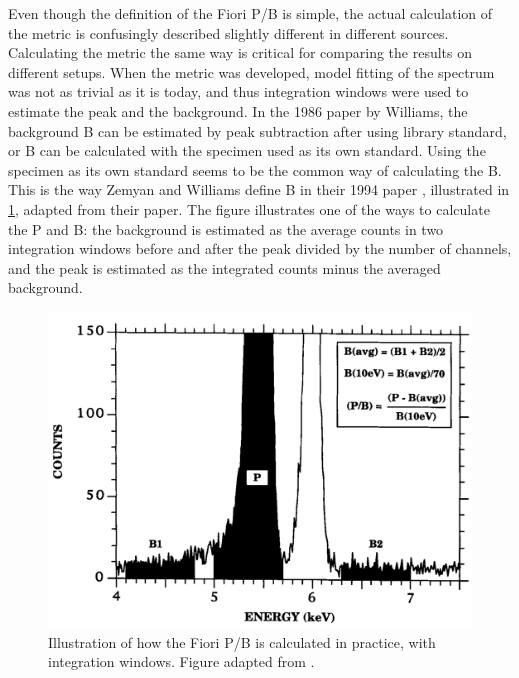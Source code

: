 Even though the definition of the Fiori P/B is simple, the actual calculation of the metric is confusingly described slightly different in different sources.
Calculating the metric the same way is critical for comparing the results on different setups.
When the metric was developed, model fitting of the spectrum was not as trivial as it is today, and thus integration windows were used to estimate the peak and the background.
In the 1986 paper by Williams, the background B can be estimated by peak subtraction after using library standard, or B can be calculated with the specimen used as its own standard.
Using the specimen as its own standard seems to be the common way of calculating the B.
This is the way Zemyan and Williams define B in their 1994 paper \cite{zemyan_standard_performance_1994}, illustrated in  \cref{fig:fiori_pb_reality}, adapted from their paper.
The figure illustrates one of the ways to calculate the P and B: the background is estimated as the average counts in two integration windows before and after the peak divided by the number of channels, and the peak is estimated as the integrated counts minus the averaged background.



\begin{figure}[htbp]
    \centering
    \includegraphics[width=0.6\linewidth]{figures/FioriPB_reality_TODO_remake.png}
    \caption{
        Illustration of how the Fiori P/B is calculated in practice, with integration windows.
        Figure adapted from \cite{zemyan_standard_performance_1994}.
    }
    \label{fig:fiori_pb_reality}
\end{figure}


